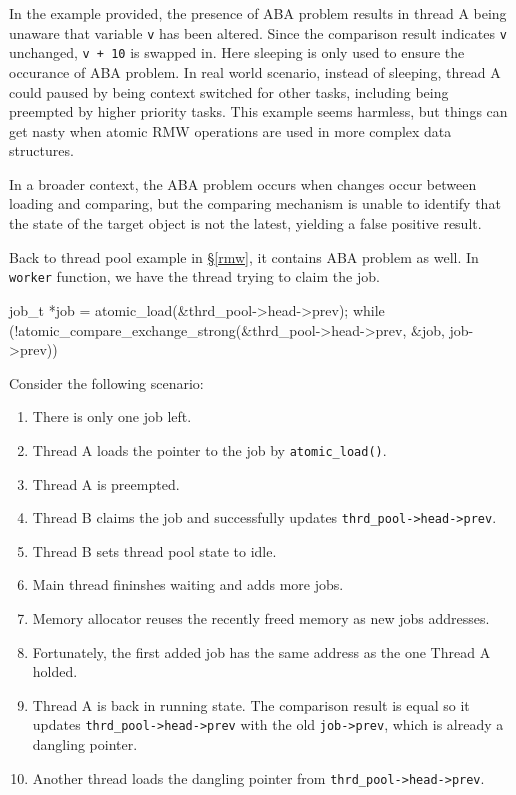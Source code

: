 \documentclass[fontsize=10pt, oneside]{scrartcl}
\newcommand{\monobox}[1]{\mbox{\texttt{#1}}}
\newcommand{\secref}[1]{\hyperref[#1]{\textsc{\S}\ref*{#1}}}
\begin{document}
In the example provided, the presence of ABA problem results in thread A being unaware that variable \monobox{v} has been altered.
Since the comparison result indicates \monobox{v} unchanged, \monobox{v + 10} is swapped in.
Here sleeping is only used to ensure the occurance of ABA problem.
In real world scenario, instead of sleeping, thread A could paused by being context switched for other tasks, including being preempted by higher priority tasks.
This example seems harmless, but things can get nasty when atomic \textsc{RMW} operations are used in more complex data structures.

In a broader context, the ABA problem occurs when changes occur between loading and comparing, but the comparing mechanism is unable to identify that the state of the target object is not the latest, yielding a false positive result.

Back to thread pool example in \secref{rmw}, it contains ABA problem as well.
In \monobox{worker} function, we have the thread trying to claim the job.

\begin{ccode}
    job_t *job = atomic_load(&thrd_pool->head->prev);
    while (!atomic_compare_exchange_strong(&thrd_pool->head->prev, &job,
                                           job->prev)) {
    }
\end{ccode}

Consider the following scenario:
\begin{enumerate}
    \item There is only one job left.
    \item Thread A loads the pointer to the job by \monobox{atomic\_load()}.
    \item Thread A is preempted.
    \item Thread B claims the job and successfully updates \monobox{thrd\_pool->head->prev}.
    \item Thread B sets thread pool state to idle.
    \item Main thread fininshes waiting and adds more jobs.
    \item Memory allocator reuses the recently freed memory as new jobs addresses.
    \item Fortunately, the first added job has the same address as the one Thread A holded.
    \item Thread A is back in running state. The comparison result is equal so it updates \monobox{thrd\_pool->head->prev} with the old \monobox{job->prev}, which is already a dangling pointer.
    \item Another thread loads the dangling pointer from \monobox{thrd\_pool->head->prev}.
\end{enumerate}
\end{document}
